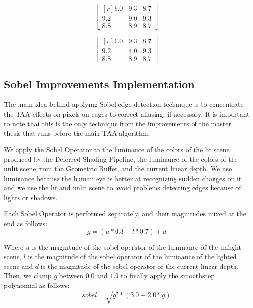 \documentclass[pregrado]{tesis-usb} %
\begin{document}
\begin{equation}\label{eq:depth_var_not_aliased}
\begin{bmatrix*}[r]
9.0 &  9.3 & 8.7 \\
9.2 &  9.0 & 9.3 \\
8.8 &  8.9 & 8.7
\end{bmatrix*}
\end{equation}

\begin{equation}\label{eq:depth_var_aliased}
\begin{bmatrix*}[r]
9.0 &  9.3 & 8.7 \\
9.2 &  4.0 & 9.3 \\
8.8 &  8.9 & 8.7
\end{bmatrix*}
\end{equation}

\subsection{Sobel Improvements Implementation}
The main idea behind applying Sobel edge detection technique is to concentrate the TAA effects on pixels on edges to correct aliasing, if necessary.  It is important to note that this is the only technique from the improvements of the master thesis that runs before the main TAA algorithm.

We apply the Sobel Operator to the luminance of the colors of the lit scene produced by the Deferred Shading Pipeline, the luminance of the colors of the unlit scene from the Geometric Buffer, and the current linear depth. We use luminance because the human eye is better at recognizing sudden changes on it and we use the lit and unlit scene to avoid problems detecting edges because of lights or shadows. 

Each Sobel Operator is performed separately, and their magnitudes mixed at the end as follows:
\begin{equation} \label{eq:sobel_g}
	g=(u*0.3 +l*0.7)+d 
\end{equation}

Where $u$ is the magnitude of the sobel operator of the luminance of the unlight scene, $l$ is the magnitude of the sobel operator of the luminance of the lighted scene and $d$ is the magnitude of the sobel operator of the current linear depth. \\

Then, we clamp $g$ between $0.0$ and $1.0$ to finally apply the smoothstep polynomial as follows:
\begin{equation} \label{eq:sobel_sqrt}
sobel=\sqrt{g^2*(3.0-2.0*g)} 
\end{equation}
\end{document}

